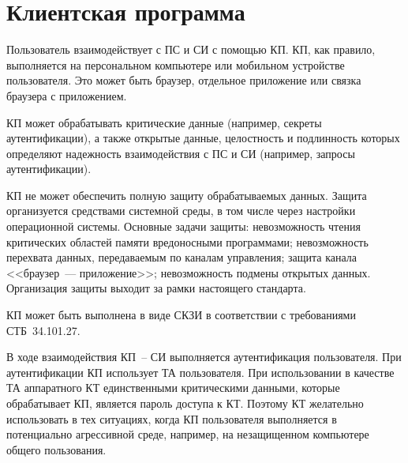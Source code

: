 \section{Клиентская программа}\label{COMMON.CP}

Пользователь взаимодействует с ПС и СИ с помощью КП.
КП, как правило, выполняется на персональном компьютере или мобильном 
устройстве пользователя. Это может быть браузер, отдельное приложение или 
связка браузера с приложением.  

КП может обрабатывать критические данные
(например, секреты аутентификации), а также открытые данные, 
целостность и подлинность которых определяют надежность  
взаимодействия с ПС и СИ (например, запросы аутентификации).

КП не может обеспечить полную защиту обрабатываемых данных. Защита организуется
средствами системной среды, в том числе через настройки операционной системы.
%
Основные задачи защиты: 
невозможность чтения критических областей памяти вредоносными программами;
невозможность перехвата данных, передаваемым по каналам управления; 
защита канала <<браузер~--- приложение>>; 
невозможность подмены открытых данных.
%
Организация защиты выходит за рамки настоящего стандарта.

КП может быть выполнена в виде СКЗИ в соответствии с требованиями 
СТБ~34.101.27.

В ходе взаимодействия КП~-- СИ выполняется аутентификация пользователя.
При аутентификации КП использует ТА пользователя. 
%
При использовании в качестве ТА аппаратного КТ единственными критическими
данными, которые обрабатывает КП, является пароль доступа к КТ. Поэтому КТ
желательно использовать в тех ситуациях, когда КП пользователя выполняется в
потенциально агрессивной среде, например, на незащищенном компьютере общего
пользования.
